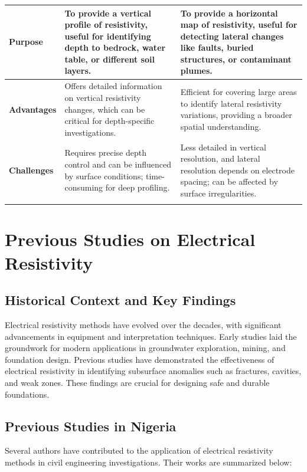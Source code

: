 \documentclass[12pt,a4paper]{report}
\begin{document}
\begin{tabular}{|>{\raggedright\arraybackslash}m{4cm}|>{\raggedright\arraybackslash}m{6cm}|>{\raggedright\arraybackslash}m{6cm}|}
    \textbf{Purpose} & To provide a vertical profile of resistivity, useful for identifying depth to bedrock, water table, or different soil layers. & To provide a horizontal map of resistivity, useful for detecting lateral changes like faults, buried structures, or contaminant plumes. \\ \hline
    
    \textbf{Advantages} & Offers detailed information on vertical resistivity changes, which can be critical for depth-specific investigations. & Efficient for covering large areas to identify lateral resistivity variations, providing a broader spatial understanding. \\ \hline
    
    \textbf{Challenges} & Requires precise depth control and can be influenced by surface conditions; time-consuming for deep profiling. & Less detailed in vertical resolution, and lateral resolution depends on electrode spacing; can be affected by surface irregularities. \\ \hline
    \label{tab:VES and CST Comparison}
\end{tabular}

\section{Previous Studies on Electrical Resistivity}

\subsection{Historical Context and Key Findings}
Electrical resistivity methods have evolved over the decades, with significant advancements in equipment and interpretation techniques. Early studies laid the groundwork for modern applications in groundwater exploration, mining, and foundation design. Previous studies have demonstrated the effectiveness of electrical resistivity in identifying subsurface anomalies such as fractures, cavities, and weak zones. These findings are crucial for designing safe and durable foundations.

\subsection{Previous Studies in Nigeria}

Several authors have contributed to the application of electrical resistivity methods in civil engineering investigations. Their works are summarized below:
\end{document}
